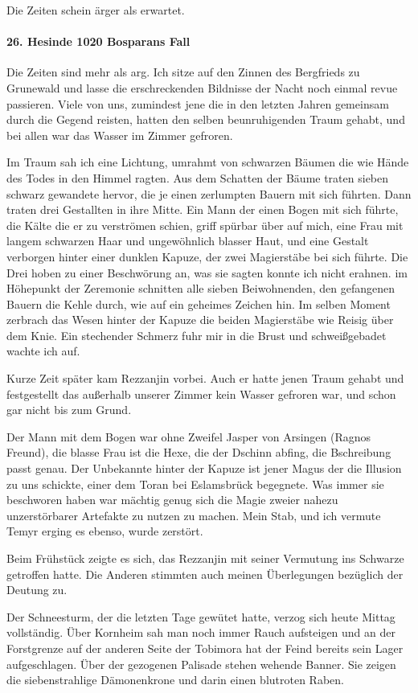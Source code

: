 Die Zeiten schein ärger als erwartet.

\paragraph{26. Hesinde 1020 Bosparans Fall}
Die Zeiten sind mehr als arg. Ich sitze auf den Zinnen des Bergfrieds zu Grunewald und lasse die erschreckenden Bildnisse der Nacht noch einmal revue passieren. Viele von uns, zumindest jene die in den letzten Jahren gemeinsam durch die Gegend reisten, hatten den selben beunruhigenden Traum gehabt, und bei allen war das Wasser im Zimmer gefroren.

Im Traum sah ich eine Lichtung, umrahmt von schwarzen Bäumen die wie Hände des Todes in den Himmel ragten. Aus dem Schatten der Bäume traten sieben schwarz gewandete hervor, die je einen zerlumpten Bauern mit sich führten. Dann traten drei Gestallten in ihre Mitte. Ein Mann der einen Bogen mit sich führte, die Kälte die er zu verströmen schien, griff spürbar über auf mich, eine Frau mit langem schwarzen Haar und ungewöhnlich blasser Haut, und eine Gestalt verborgen hinter einer dunklen Kapuze, der zwei Magierstäbe bei sich führte. Die Drei hoben zu einer Beschwörung an, was sie sagten konnte ich nicht erahnen. im Höhepunkt der Zeremonie schnitten alle sieben Beiwohnenden, den gefangenen Bauern die Kehle durch, wie auf ein geheimes Zeichen hin. Im selben Moment zerbrach das Wesen hinter der Kapuze die beiden Magierstäbe wie Reisig über dem Knie. Ein stechender Schmerz fuhr mir in die Brust und schweißgebadet wachte ich auf.

Kurze Zeit später kam Rezzanjin vorbei. Auch er hatte jenen Traum gehabt und festgestellt das außerhalb unserer Zimmer kein Wasser gefroren war, und schon gar nicht bis zum Grund.

Der Mann mit dem Bogen war ohne Zweifel Jasper von Arsingen (Ragnos Freund), die blasse Frau ist die Hexe, die der Dschinn abfing, die Bschreibung passt genau. Der Unbekannte hinter der Kapuze ist jener Magus der die Illusion zu uns schickte, einer dem Toran bei Eslamsbrück begegnete. Was immer sie beschworen haben war mächtig genug sich die Magie zweier nahezu unzerstörbarer Artefakte zu nutzen zu machen. Mein Stab, und ich vermute Temyr erging es ebenso, wurde zerstört.

Beim Frühstück zeigte es sich, das Rezzanjin mit seiner Vermutung ins Schwarze getroffen hatte. Die Anderen stimmten auch meinen Überlegungen bezüglich der Deutung zu.

Der Schneesturm, der die letzten Tage gewütet hatte, verzog sich heute Mittag vollständig. Über Kornheim sah man noch immer Rauch aufsteigen und an der Forstgrenze auf der anderen Seite der Tobimora hat der Feind bereits sein Lager aufgeschlagen. Über der gezogenen Palisade stehen wehende Banner. Sie zeigen die siebenstrahlige Dämonenkrone und darin einen blutroten Raben.

